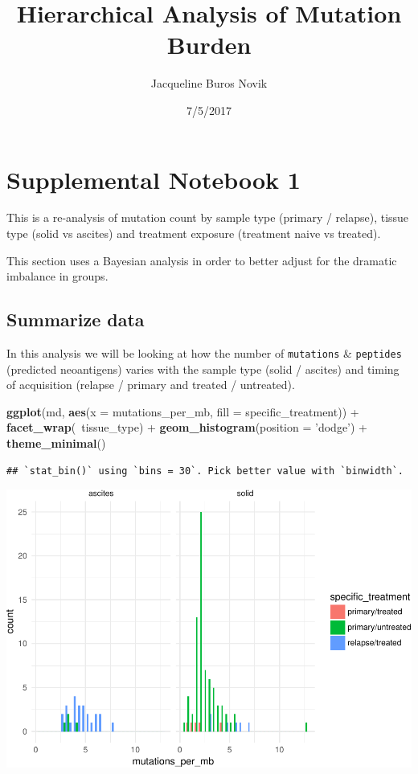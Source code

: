 \documentclass[]{article}
\title{Hierarchical Analysis of Mutation Burden}
\author{Jacqueline Buros Novik}
\date{7/5/2017}
\newenvironment{Shaded}{\begin{snugshade}}{\end{snugshade}}
\newcommand{\KeywordTok}[1]{\textcolor[rgb]{0.13,0.29,0.53}{\textbf{{#1}}}}
\newcommand{\DataTypeTok}[1]{\textcolor[rgb]{0.13,0.29,0.53}{{#1}}}
\newcommand{\StringTok}[1]{\textcolor[rgb]{0.31,0.60,0.02}{{#1}}}
\newcommand{\NormalTok}[1]{{#1}}
\begin{document}
\maketitle


{
\hypersetup{linkcolor=black}
\setcounter{tocdepth}{2}
\tableofcontents
}
\section{Supplemental Notebook 1}\label{supplemental-notebook-1}

This is a re-analysis of mutation count by sample type (primary /
relapse), tissue type (solid vs ascites) and treatment exposure
(treatment naive vs treated).

This section uses a Bayesian analysis in order to better adjust for the
dramatic imbalance in groups.

\subsection{Summarize data}\label{summarize-data}

In this analysis we will be looking at how the number of
\texttt{mutations} \& \texttt{peptides} (predicted neoantigens) varies
with the sample type (solid / ascites) and timing of acquisition
(relapse / primary and treated / untreated).

\begin{Shaded}
\begin{Highlighting}[]
\KeywordTok{ggplot}\NormalTok{(md, }\KeywordTok{aes}\NormalTok{(}\DataTypeTok{x =} \NormalTok{mutations_per_mb, }\DataTypeTok{fill =} \NormalTok{specific_treatment)) +}\StringTok{ }
\StringTok{  }\KeywordTok{facet_wrap}\NormalTok{(~tissue_type) +}
\StringTok{  }\KeywordTok{geom_histogram}\NormalTok{(}\DataTypeTok{position =} \StringTok{'dodge'}\NormalTok{) +}
\StringTok{  }\KeywordTok{theme_minimal}\NormalTok{()}
\end{Highlighting}
\end{Shaded}

\begin{verbatim}
## `stat_bin()` using `bins = 30`. Pick better value with `binwidth`.
\end{verbatim}

\includegraphics{Hierarchical_model_mutations_and_peptides_files/figure-latex/plot-data-1.pdf}
\end{document}
